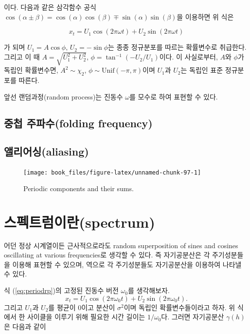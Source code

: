 \documentclass[b5paper,]{scrbook}
\theoremstyle{plain}
\theoremstyle{definition}
\numberwithin{equation}{section}
\let\BeginKnitrBlock\begin \let\EndKnitrBlock\end
\begin{document}
이다. 다음과 같은 삼각함수 공식
\(\cos (\alpha \pm \beta)= \cos (\alpha) \cos (\beta) \mp \sin(\alpha)\sin(\beta)\)을
이용하면 위 식은

\begin{equation}\label{eq:periodrp}
x_{t}=U_{1}\cos(2\pi\omega t) + U_{2}\sin(2\pi\omega t)
\end{equation}

가 되며 \(U_{1}=A\cos \phi\), \(U_{2}=-\sin\phi\)는 종종 정규분포를
따르는 확률변수로 취급한다. 그리고 이 때
\(A=\sqrt{U_{1}^{2}+U_{2}^{2}}\), \(\phi=\tan^{-1}(-U_{2}/U_{1})\)이다.
이 사실로부터, \(A\)와 \(\phi\)가 독립인 확률변수면,
\(A^{2}\sim \chi_{2}\), \(\phi \sim \text{Unif}(-\pi, \pi)\)이며
\(U_{1}\)과 \(U_{2}\)는 독립인 표준 정규분포를 따른다.

앞선 랜덤과정(random process)는 진동수 \(\omega\)를 모수로 하여 표현할
수 있다.

\subsection{중첩 주파수(folding frequency)}\label{-folding-frequency}

\subsection{앨리어싱(aliasing)}\label{aliasing}

\begin{figure}

{\centering \texttt{[image: book\_files/figure-latex/unnamed-chunk-97-1]} 

}

\caption{Periodic components and their sums.}\label{fig:unnamed-chunk-97}
\end{figure}

\section{스펙트럼이란(spectrum)}\label{spectrum}

\BeginKnitrBlock{theorem}[정상과정의 스펙트럼 표현]
\protect\hypertarget{thm:unnamed-chunk-98}{}{\label{thm:unnamed-chunk-98}
{} } 어던 정상 시계열이든
근사적으로라도 random superposition of sines and cosines oscillating at
various frequencies로 생각할 수 있다. 즉 자기공분산은 각 주기성분들을
이용해 표현할 수 있으며, 역으로 각 주기성분들도 자기공분산을 이용하여
나타낼 수 있다.
\EndKnitrBlock{theorem}

식 (\eqref{eq:periodrp})의 고정된 진동수 버전 \(\omega_{0}\)를 생각해보자.
\[x_{t}=U_{1}\cos (2\pi\omega_{0}t) + U_{2}\sin(2\pi\omega_{0}t).\]
그리고 \(U_{1}\)과 \(U_{2}\)를 평균이 0이고 분산이 \(\sigma^{2}\)이며
독립인 확률변수들이라고 하자. 위 식에서 한 사이클을 이루기 위해 필요한
시간 길이는 \(1/\omega_{0}\)다. 그러면 자기공분산 \(\gamma(h)\)은 다음과
같이
\end{document}
